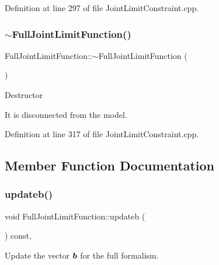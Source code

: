 Definition at line 297 of file Joint\+Limit\+Constraint.\+cpp.

\hypertarget{classocra_1_1FullJointLimitFunction_a84cc9b5e7efdf78fe9a279ef5940871b}{}\label{classocra_1_1FullJointLimitFunction_a84cc9b5e7efdf78fe9a279ef5940871b} 
\subsubsection{\texorpdfstring{$\sim$\+Full\+Joint\+Limit\+Function()}{~FullJointLimitFunction()}}
{\footnotesize\ttfamily Full\+Joint\+Limit\+Function\+::$\sim$\+Full\+Joint\+Limit\+Function (\begin{DoxyParamCaption}{ }\end{DoxyParamCaption})}

Destructor

It is disconnected from the model. 

Definition at line 317 of file Joint\+Limit\+Constraint.\+cpp.



\subsection{Member Function Documentation}
\hypertarget{classocra_1_1FullJointLimitFunction_a3c9bcab2026535cc5f2c0176552d449d}{}\label{classocra_1_1FullJointLimitFunction_a3c9bcab2026535cc5f2c0176552d449d} 
\subsubsection{\texorpdfstring{updateb()}{updateb()}}
{\footnotesize\ttfamily void Full\+Joint\+Limit\+Function\+::updateb (\begin{DoxyParamCaption}{ }\end{DoxyParamCaption}) const\hspace{0.3cm}{\ttfamily [protected]}, {\ttfamily [virtual]}}

Update the vector $ \mbox{\boldmath${b}$} $ for the full formalism.

